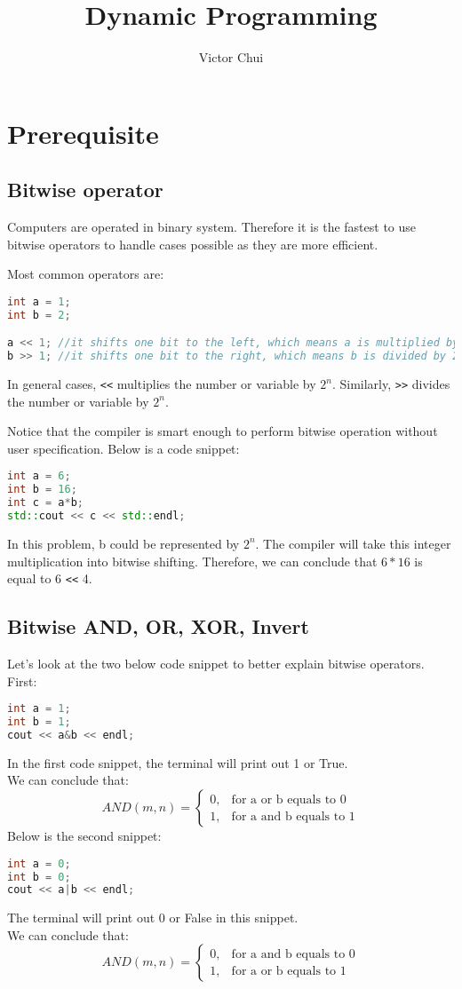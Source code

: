 \documentclass{article}
\title{Dynamic Programming}
\author{Victor Chui}
\begin{document}
\maketitle
\section{Prerequisite}
\subsection{Bitwise operator}
Computers are operated in binary system. Therefore it is the fastest
to use bitwise operators to handle cases possible as they are 
more efficient.


Most common operators are:
\begin{lstlisting}[language=C++]
int a = 1;
int b = 2;

a << 1; //it shifts one bit to the left, which means a is multiplied by 2.
b >> 1; //it shifts one bit to the right, which means b is divided by 2.

\end{lstlisting}
In general cases, \texttt{<<} multiplies the number or variable by $2^n$.
Similarly, \texttt{>>} divides the number or variable by $2^n$.

Notice that the compiler is smart enough to perform bitwise operation
without user specification. Below is a code snippet:


\begin{lstlisting}[language=C++]
int a = 6;
int b = 16;
int c = a*b;
std::cout << c << std::endl;
\end{lstlisting}
In this problem, b could be represented by $2^n$. The compiler will
take this integer multiplication into bitwise shifting. 
Therefore, we can conclude that $6*16$ is equal to 6 \texttt{<<} 4.
\subsection{Bitwise AND, OR, XOR, Invert}
Let's look at the two below code snippet to better explain bitwise operators.
First:
\begin{lstlisting}[language=C++]
int a = 1;
int b = 1;
cout << a&b << endl;
\end{lstlisting}
In the first code snippet, the terminal will print out 1 or True. 
\\We can conclude that: \[
    AND(m,n) = \begin{cases}
        0, & \text{for a or b equals to 0} \\
        1, & \text{for a and b equals to 1}
        \end{cases}
  \]
Below is the second snippet:
\begin{lstlisting}[language=C++]
int a = 0;
int b = 0;
cout << a|b << endl;
\end{lstlisting}
The terminal will print out 0 or False in this snippet. 
\\We can conclude that: \[
    AND(m,n) = \begin{cases}
        0, & \text{for a and b equals to 0} \\
        1, & \text{for a or b equals to 1}
        \end{cases}
  \]
\end{document}
